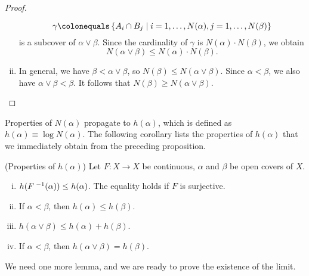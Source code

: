 \documentclass[10pt,twoside,draft]{book}
\begin{document}
\begin{proposition}
\begin{proof}
\begin{enumerate}[(i)]
\begin{equation*}
          \gamma \ceq \setst{A_i \cap B_j}{i = 1, \ldots, N(\alpha), j = 1, \ldots, N(\beta)}
        \end{equation*}
        is a subcover of $\alpha \vee \beta$.
        Since the cardinality of $\gamma$ is $N(\alpha) \cdot N(\beta)$, we obtain
        \begin{equation*}
          N(\alpha \vee \beta) \leq N(\alpha) \cdot N(\beta).
        \end{equation*}
      \item
        In general, we have $\beta < \alpha \vee \beta$, so $N(\beta) \leq N(\alpha \vee \beta)$.
        Since $\alpha < \beta$, we also have $\alpha \vee \beta < \beta$.
        It follows that $N(\beta) \geq N(\alpha \vee \beta)$.
    \end{enumerate}
  \end{proof}
\end{proposition}
Properties of $N(\alpha)$ propagate to $h(\alpha)$, which is defined as $h(\alpha) \equiv \log N(\alpha)$.
The following corollary lists the properties of $h(\alpha)$ that we immediately obtain from the preceding proposition.
\begin{corollary}
  (Properties of $h(\alpha)$)
  Let $F: X \to X$ be continuous, $\alpha$ and $\beta$ be open covers of $X$.
  \begin{enumerate}[(i)]
    \item 
      $h(F^{\;-1}(\alpha)) \leq h(\alpha)$.
      The equality holds if $F$ is surjective.
    \item 
      If $\alpha < \beta$, then $h(\alpha) \leq h(\beta)$.
    \item
      $h(\alpha \vee \beta) \leq h(\alpha) + h(\beta)$.
    \item
      If $\alpha < \beta$, then $h(\alpha \vee \beta) = h(\beta)$.
  \end{enumerate}
  \label{cor:ha-props}
\end{corollary}
We need one more lemma, and we are ready to prove the existence of the limit.
\end{document}
